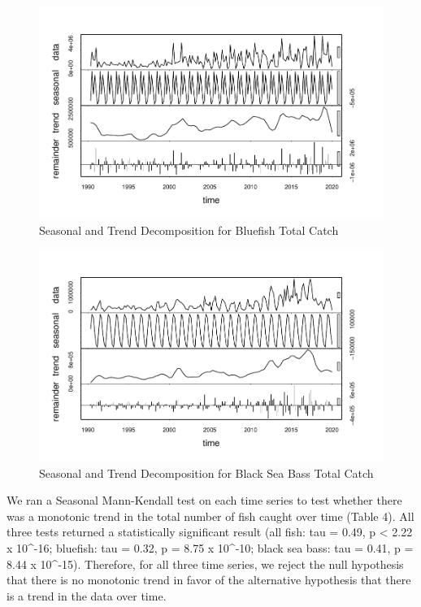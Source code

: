 \documentclass[
  12pt,
]{article}
\begin{document}
\begin{figure}[H]

\hfill{}\includegraphics{Report_FishTrends_files/figure-latex/Bluefish Trends-1} 

\caption{Seasonal and Trend Decomposition for Bluefish Total Catch}\label{fig:Bluefish Trends}
\end{figure}

\begin{figure}[H]

\hfill{}\includegraphics{Report_FishTrends_files/figure-latex/Black Sea Bass Trends-1} 

\caption{Seasonal and Trend Decomposition for Black Sea Bass Total Catch}\label{fig:Black Sea Bass Trends}
\end{figure}

We ran a Seasonal Mann-Kendall test on each time series to test whether
there was a monotonic trend in the total number of fish caught over time
(Table 4). All three tests returned a statistically significant result
(all fish: tau = 0.49, p \textless{} 2.22 x 10\^{}-16; bluefish: tau =
0.32, p = 8.75 x 10\^{}-10; black sea bass: tau = 0.41, p = 8.44 x
10\^{}-15). Therefore, for all three time series, we reject the null
hypothesis that there is no monotonic trend in favor of the alternative
hypothesis that there is a trend in the data over time.
\end{document}
